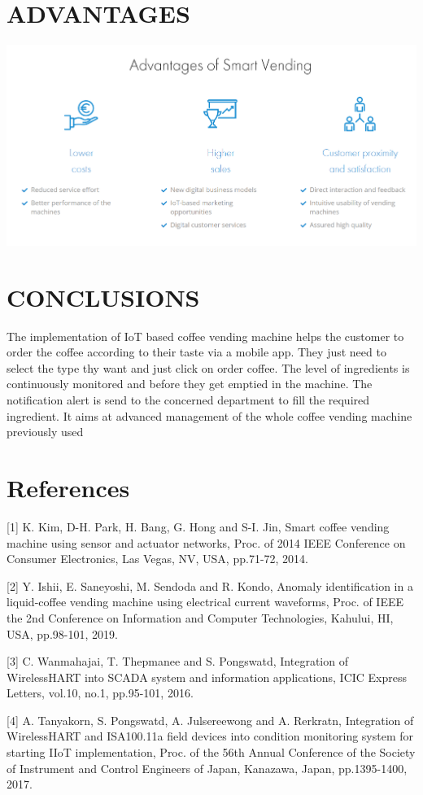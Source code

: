 \documentclass[letterpaper,12pt]{article}
\begin{document}
\section{ADVANTAGES}

\includegraphics[scale=0.4]{adv.png}



\section{CONCLUSIONS}
The implementation of IoT based coffee vending machine helps the customer to order the coffee according to their taste
via a mobile app. They just need to select the type thy want and just click on order coffee. The level of ingredients is
continuously monitored and before they get emptied in the machine. The notification alert is send to the concerned
department to fill the required ingredient. It aims at advanced management of the whole coffee vending machine
previously used

\section{References}
[1] K. Kim, D-H. Park, H. Bang, G. Hong and S-I. Jin, Smart coffee vending machine using sensor and
actuator networks, Proc. of 2014 IEEE Conference on Consumer Electronics, Las Vegas, NV, USA,
pp.71-72, 2014.


[2] Y. Ishii, E. Saneyoshi, M. Sendoda and R. Kondo, Anomaly identification in a liquid-coffee vending
machine using electrical current waveforms, Proc. of IEEE the 2nd Conference on Information and
Computer Technologies, Kahului, HI, USA, pp.98-101, 2019.


[3] C. Wanmahajai, T. Thepmanee and S. Pongswatd, Integration of WirelessHART into SCADA system
and information applications, ICIC Express Letters, vol.10, no.1, pp.95-101, 2016.


[4] A. Tanyakorn, S. Pongswatd, A. Julsereewong and A. Rerkratn, Integration of WirelessHART and
ISA100.11a field devices into condition monitoring system for starting IIoT implementation, Proc. of
the 56th Annual Conference of the Society of Instrument and Control Engineers of Japan, Kanazawa,
Japan, pp.1395-1400, 2017.
\end{document}
